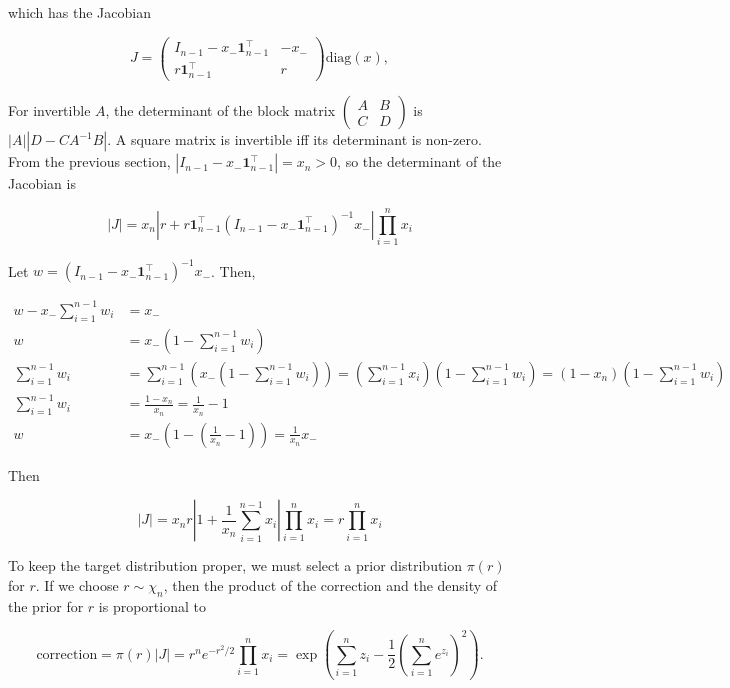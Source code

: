 \documentclass[twoside]{article}
\begin{document}
which has the Jacobian

$$J = \begin{pmatrix}I_{n-1} - x_- \boldsymbol{1}_{n-1}^\top & -x_- \\ r \boldsymbol{1}_{n-1}^\top & r \end{pmatrix} \mathrm{diag}(x),$$

For invertible $A$, the determinant of the block matrix $\begin{pmatrix}A & B \\ C & D\end{pmatrix}$ is $|A| |D-CA^{-1}B|$.
A square matrix is invertible iff its determinant is non-zero.
From the previous section, $|I_{n-1} - x_- \boldsymbol{1}_{n-1}^\top| = x_n > 0$, so the determinant of the Jacobian is

$$|J| = x_n \left|r + r \boldsymbol{1}_{n-1}^\top (I_{n-1} - x_- \boldsymbol{1}_{n-1}^\top)^{-1} x_-\right| \prod_{i=1}^n x_i$$

Let $w = (I_{n-1} - x_- \boldsymbol{1}_{n-1}^\top)^{-1} x_-$. Then,

$$
\begin{aligned}
    w - x_- \sum_{i=1}^{n-1} w_i &= x_-\\
    w &= x_- \left(1 - \sum_{i=1}^{n-1} w_i\right)\\
    \sum_{i=1}^{n-1} w_i &= \sum_{i=1}^{n-1} \left( x_- (1 - \sum_{i=1}^{n-1} w_i) \right) = \left(\sum_{i=1}^{n-1} x_i \right) \left(1 - \sum_{i=1}^{n-1} w_i\right) = (1 - x_n)  \left(1 - \sum_{i=1}^{n-1} w_i\right)\\
    \sum_{i=1}^{n-1} w_i &= \frac{1 - x_n}{x_n} = \frac{1}{x_n} - 1\\
    w &= x_- \left(1 - \left(\frac{1}{x_n} - 1\right)\right) = \frac{1}{x_n} x_-
\end{aligned}
$$

Then

$$|J| = x_n r \left|1 + \frac{1}{x_n}\sum_{i=1}^{n-1} x_i\right| \prod_{i=1}^n x_i = r \prod_{i=1}^n x_i$$

To keep the target distribution proper, we must select a prior distribution $\pi(r)$ for $r$.
If we choose $r \sim \chi_n$, then the product of the correction and the density of the prior for $r$ is proportional to

$$\mathrm{correction} = \pi(r) |J| = r^n e^{-r^2/2} \prod_{i=1}^n x_i = \exp\left(\sum_{i=1}^n z_i - \frac{1}{2}\left(\sum_{i=1}^n e^{z_i}\right)^2\right).$$

\vfill
\end{document}
